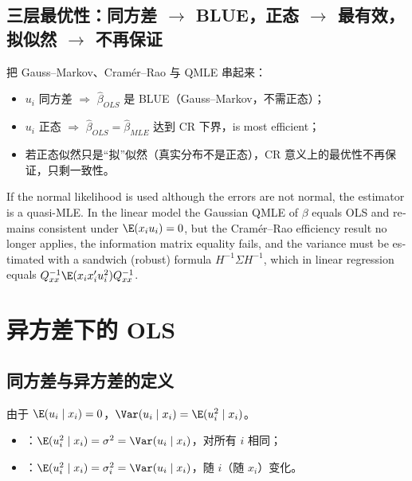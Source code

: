 \subsection{三层最优性：同方差 \texorpdfstring{$\to$}{->} BLUE，正态 \texorpdfstring{$\to$}{->} 最有效，拟似然 \texorpdfstring{$\to$}{->} 不再保证}

把 Gauss--Markov、Cramér--Rao 与 QMLE 串起来：
\begin{itemize}
  \item $u_i$ 同方差 $\Rightarrow$ $\hat\beta_{OLS}$ 是 BLUE（Gauss--Markov，不需正态）；
  \item $u_i$ 正态 $\Rightarrow$ $\hat\beta_{OLS}=\hat\beta_{MLE}$ 达到 CR 下界，is most efficient；
  \item 若正态似然只是“拟”似然（真实分布不是正态），CR 意义上的最优性不再保证，只剩一致性。
\end{itemize}

\begin{english}
If the normal likelihood is used although the errors are not normal, the estimator is a quasi-MLE. In the linear model the Gaussian QMLE of $\beta$ equals OLS and remains consistent under $\E(x_iu_i)=0$, but the Cramér--Rao efficiency result no longer applies, the information matrix equality fails, and the variance must be estimated with a sandwich (robust) formula $H^{-1}\Sigma H^{-1}$, which in linear regression equals $Q_{xx}^{-1}\E(x_ix_i'u_i^2)Q_{xx}^{-1}$.
\end{english}

\section{异方差下的 OLS}\label{sec:U04-het}

\subsection{同方差与异方差的定义}

由于 $\E(u_i\mid x_i)=0$，$\Var(u_i\mid x_i)=\E(u_i^2\mid x_i)$。
\begin{itemize}
  \item {}：$\E(u_i^2\mid x_i)=\sigma^2=\Var(u_i\mid x_i)$，对所有 $i$ 相同；
  \item {}：$\E(u_i^2\mid x_i)=\sigma_i^2=\Var(u_i\mid x_i)$，随 $i$（随 $x_i$）变化。
\end{itemize}

